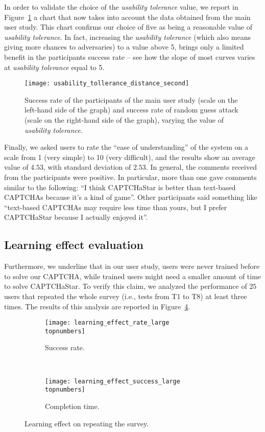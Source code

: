\documentclass[conference]{IEEEtran}
\newcommand{\topnumbers}{}
\newcommand{\hilight}[1]{#1}
\begin{document}
In order to validate the choice of the \textit{usability tolerance} value, we report in Figure~\ref{fig:usability_tollerance_second} \hilight{a chart that now takes into account the data obtained from the main user study.}
This chart confirms our choice of five as being a reasonable value of \textit{usability tolerance}.
In fact, increasing the \textit{usability tolerance} (which also means giving more chances to adversaries) to a value above 5, brings only a limited benefit in the participants success rate -- see how the slope of most curves varies at \textit{usability tolerance} equal to 5.
\begin{figure}[ht]
\centering
\texttt{[image: usability\_tollerance\_distance\_second]}\caption{Success rate of the participants of the main user study (scale on the left-hand side of the graph) and success rate of random guess attack (scale on the right-hand side of the graph), varying the value of \textit{usability tolerance}.}
\label{fig:usability_tollerance_second}
\end{figure}


Finally, we asked users to rate the ``ease of understanding'' \hilight{of the system} on a scale from 1 (very simple) to 10 (very difficult), and the results show an average value of $4.53$, with standard deviation of $2.53$.
In general, the comments received from the participants were positive. In particular, more than one gave comments similar to the following: ``I think CAPTCHaStar is better than text-based CAPTCHAs because it's a kind of game''. Other participants said something like ``text-based CAPTCHAs may require less time than yours, but I prefer CAPTCHaStar because I actually enjoyed it''.


\subsection{Learning effect evaluation}
Furthermore, we underline that in our user study, users were never trained before to solve our CAPTCHA, while trained users might need a smaller amount of time to solve CAPTCHaStar.
To verify this claim, we analyzed the performance of $25$ users that repeated the whole survey (i.e., tests from T1 to T8) at least three times.
The results of this analysis are reported in Figure~\ref{fig:learning_effect}. \begin{figure}[t]
\centering
\begin{subfigure}{.48\textwidth}
\texttt{[image: learning\_effect\_rate\_large\\topnumbers]}
\caption{Success rate.}
\label{fig:learning_effect_rate}
\end{subfigure}
\\
\vspace{0.5cm}
\begin{subfigure}{.48\textwidth}
\texttt{[image: learning\_effect\_success\_large\\topnumbers]}
\caption{Completion time.}
\label{fig:learning_effect_success}
\end{subfigure}
\caption{Learning effect on repeating the survey.}
\label{fig:learning_effect}
\end{figure}
\end{document}

